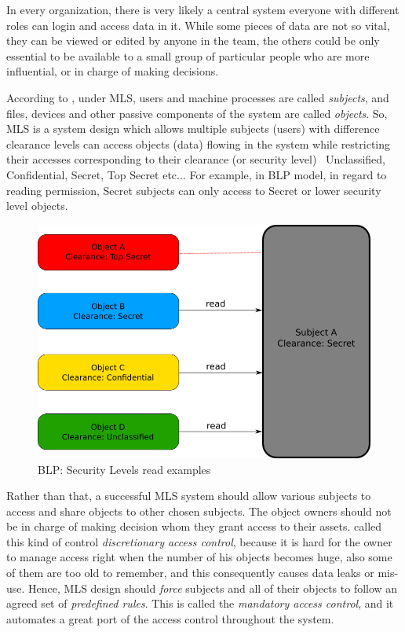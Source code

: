 In every organization, there is very likely a central system everyone with different roles can login and access data in it.
While some pieces of data are not so vital, they can be viewed or edited by anyone in the team, the others could be only essential to be available to a small group of particular people who are more influential, or in charge of making decisions.

According to \citeauthor{bancinco:2015} \cite{bancinco:2015}, under MLS, users and machine processes are called \emph{subjects}, and files, devices and other passive components of the system are called \emph{objects}.
So, MLS is a system design which allows multiple subjects (users) with difference clearance levels can access objects (data) flowing in the system while restricting their accesses corresponding to their clearance (or security level) \eg\ Unclassified, Confidential, Secret, Top Secret etc...
For example, in BLP model, in regard to reading permission, Secret subjects can only access to Secret or lower security level objects.

\begin{figure}[bth]                                                                                                                                                  
\myfloatalign
\includegraphics[width=1.0\linewidth]{gfx/chapter_2/security_level_read_example}
\caption[BLP: Security Levels read examples]{BLP: Security Levels read examples}\label{fig:security_level_read_example}
\end{figure}

Rather than that, a successful MLS system should allow various subjects to access and share objects to other chosen subjects.
The object owners should not be in charge of making decision whom they grant access to their assets. \citeauthor{prasun:1996} \cite{prasun:1996} called this kind of control \emph{discretionary access control}, because it is hard for the owner to manage access right when the number of his objects becomes huge, also some of them are too old to remember, and this consequently causes data leaks or mis-use.
Hence, MLS design should \emph{force} subjects and all of their objects to follow an agreed set of \emph{predefined rules}.
This is called the \emph{mandatory access control}, and it automates a great port of the access control throughout the system.

